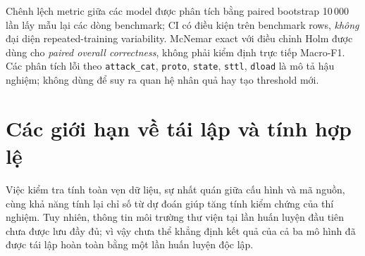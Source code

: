 Chênh lệch metric giữa các model được phân tích bằng paired bootstrap 10\,000 lần lấy mẫu lại các dòng benchmark; CI có điều kiện trên benchmark rows, \emph{không} đại diện repeated-training variability. McNemar exact với điều chỉnh Holm được dùng cho \emph{paired overall correctness}, không phải kiểm định trực tiếp Macro-F1. Các phân tích lỗi theo \texttt{attack\_cat}, \texttt{proto}, \texttt{state}, \texttt{sttl}, \texttt{dload} là mô tả hậu nghiệm; không dùng để suy ra quan hệ nhân quả hay tạo threshold mới.

\section{Các giới hạn về tái lập và tính hợp lệ}
Việc kiểm tra tính toàn vẹn dữ liệu, sự nhất quán giữa cấu hình và mã nguồn, cùng khả năng tính lại chỉ số từ dự đoán giúp tăng tính kiểm chứng của thí nghiệm. Tuy nhiên, thông tin môi trường thư viện tại lần huấn luyện đầu tiên chưa được lưu đầy đủ; vì vậy chưa thể khẳng định kết quả của cả ba mô hình đã được tái lập hoàn toàn bằng một lần huấn luyện độc lập.
